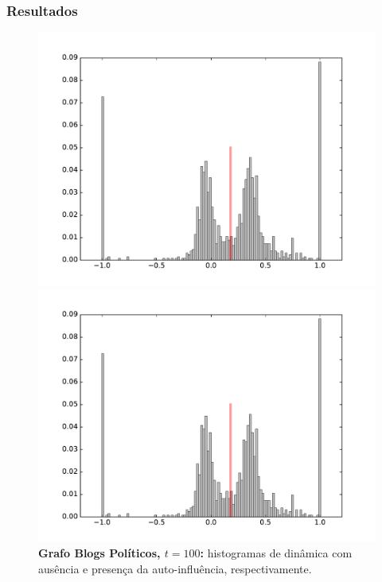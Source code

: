 \begin{frame}
  \frametitle{Resultados}

  \begin{figure}
  \centering
  \begin{minipage}{5.5cm}
    \includegraphics[width=\textwidth]{./figures/99H100}
  \end{minipage}
  \begin{minipage}{5.5cm}
    \includegraphics[width=\textwidth]{./figures/99SIH100}
  \end{minipage}
  \vspace{5mm}
  \caption*{\textbf{Grafo Blogs Políticos, $t = 100$:} histogramas de dinâmica com
    ausência e presença da auto-influência, respectivamente.}
  \end{figure}
\end{frame}

